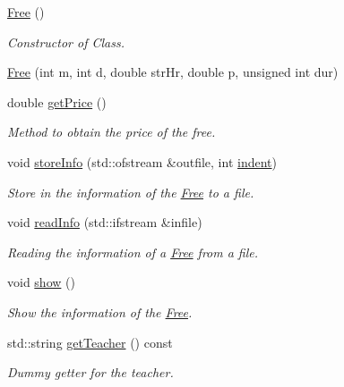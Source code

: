 \begin{DoxyCompactItemize}
\item 
\mbox{\label{class_free_a4a847fee0a934284fc4581282706e885}} 
\mbox{\hyperlink{class_free_a4a847fee0a934284fc4581282706e885}{Free}} ()
\begin{DoxyCompactList}\small\item\em Constructor of Class. \end{DoxyCompactList}\item 
\mbox{\hyperlink{class_free_afe1bb925d237595d9fd75fb2e7772314}{Free}} (int m, int d, double str\+Hr, double p, unsigned int dur)
\item 
double \mbox{\hyperlink{class_free_a229f009a7535eeba0a6ff4495de8c6bf}{get\+Price}} ()
\begin{DoxyCompactList}\small\item\em Method to obtain the price of the free. \end{DoxyCompactList}\item 
void \mbox{\hyperlink{class_free_a5eec9da16ebf4f388d16dd270bd93b64}{store\+Info}} (std\+::ofstream \&outfile, int \mbox{\hyperlink{class_reservation_a480981ed050bae19bc74bbb0bbb459f9}{indent}})
\begin{DoxyCompactList}\small\item\em Store in the information of the \mbox{\hyperlink{class_free}{Free}} to a file. \end{DoxyCompactList}\item 
void \mbox{\hyperlink{class_free_ad1023c825c9790edf0797e2e69dd2fcf}{read\+Info}} (std\+::ifstream \&infile)
\begin{DoxyCompactList}\small\item\em Reading the information of a \mbox{\hyperlink{class_free}{Free}} from a file. \end{DoxyCompactList}\item 
\mbox{\label{class_free_acdd5db6cb64932312fc5e096265ebffa}} 
void \mbox{\hyperlink{class_free_acdd5db6cb64932312fc5e096265ebffa}{show}} ()
\begin{DoxyCompactList}\small\item\em Show the information of the \mbox{\hyperlink{class_free}{Free}}. \end{DoxyCompactList}\item 
std\+::string \mbox{\hyperlink{class_free_a785a58afc51a7b1920e7b2a96ff9ca52}{get\+Teacher}} () const
\begin{DoxyCompactList}\small\item\em Dummy getter for the teacher. \end{DoxyCompactList}\end{DoxyCompactItemize}
